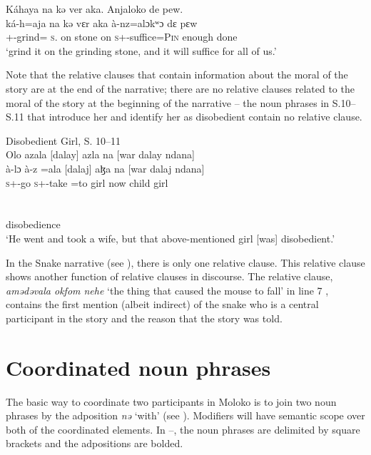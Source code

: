 \largerpage
\medskip
Káhaya  na  kə  ver  aka. Anjaloko  de  pew.\\
\gll ká-h=aja na kə vɛr aka à-nz=alɔkʷɔ dɛ pɛw\\
     {\twoS}+{\IFV}-grind={\PLU}  \textsc{s}.{\DO}  on  stone on            \textsc{s}+{\PFV}-suffice=\textsc{Pin} enough  done\\
\glt ‘grind it on the grinding stone, and it will suffice for all of us.’\\
\z

Note that the relative clauses that contain information about the moral of the story are at the end of the narrative; there are no relative clauses related to the moral of the story at the beginning of the narrative -- the noun phrases in S.10--S.11  that introduce her and identify her as disobedient contain no relative clause. 

\ea \label{ex:5:116}\corpussource Disobedient Girl, S. 10--11\\
Olo  azala  [dalay] azla  na [war  dalay   ndana] \\ 
\gll  à-lɔ           à-z  =ala      [dalaj] aɮa  na  [war      dalaj    ndana] \\  
      \textsc{s}+{\PFV}-go   \textsc{s}+{\PFV}-take =to  girl  now   {\PSP}   child    girl    {\DEM}\\  
      
      \medskip
 [cezlere  ga.]\\     
\gll [tʃɛɮɛrɛ       ga]\\
     disobedience {\ADJ}\\
\glt  ‘He went and took a wife, but that above-mentioned girl [was] disobedient.’
\z

In the Snake narrative (see ), there is only one relative clause. This relative clause shows another function of relative clauses in discourse. The relative clause, \textit{amədəvala okfom nehe} ‘the thing that caused the mouse to fall’ in line 7 , contains the first mention (albeit indirect) of the snake who is a central participant in the story and the reason that the story was told. 

\section{Coordinated noun phrases}\label{sec:5.5}
\hypertarget{RefHeading1211801525720847}{}
The basic way to coordinate two participants in Moloko is to join two noun phrases by the adposition \textit{nə} ‘with’ (see ). Modifiers will have semantic scope over both of the coordinated elements. In --, the noun phrases are delimited by square brackets and the adpositions are bolded. 

